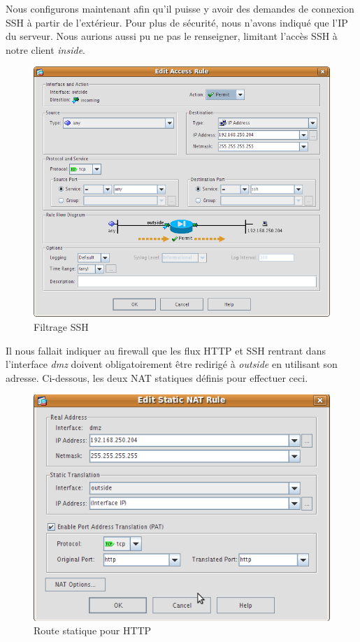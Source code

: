 \documentclass[a4paper,12pt]{article}
\begin{document}
Nous configurons maintenant afin qu'il puisse y avoir des demandes de connexion SSH à partir de l'extérieur. Pour plus de sécurité, nous n'avons indiqué que 
l'IP du serveur. Nous aurions aussi pu ne pas le renseigner, limitant l'accès SSH à notre client \textit{inside}.
\begin{figure}[H]
	\center
	\includegraphics[width=12cm]{img/18-policyoutsidesshserver.png}
	\caption{Filtrage SSH}
\end{figure}

Il nous fallait indiquer au firewall que les flux HTTP et SSH rentrant dans l'interface \textit{dmz} doivent obligatoirement être redirigé à \textit{outside}
en utilisant son adresse. Ci-dessous, les deux NAT statiques définis pour effectuer ceci.
\begin{figure}[H]
	\center
	\includegraphics[width=12cm]{img/19-natstaticdmzhttp.png}
	\caption{Route statique pour HTTP}
\end{figure}
\end{document}
